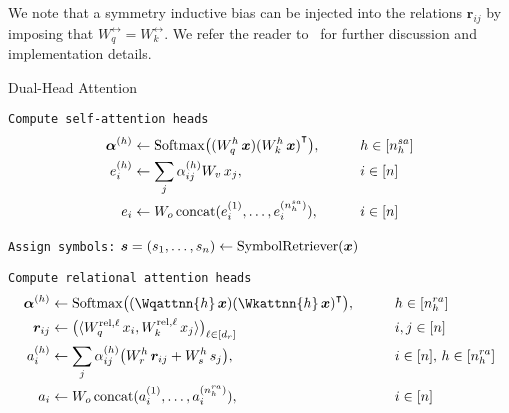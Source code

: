 We note that a symmetry inductive bias can be injected into the relations $\bm{r}_{ij}$ by imposing that $W_{q}^{\rel} = W_k^{\rel}$. We refer the reader to~ for further discussion and implementation details.


\begin{algorithm}[ht!]
	\caption{Dual-Head Attention}\label{alg:dual_head_attn}

    \vspace{1em}

    \texttt{Compute self-attention heads}
    \begin{align*}
        \bm{\alpha}^{(h)} &\gets \mathrm{Softmax}\big({(W_q^h\, \bm{x})} {(W_k^h\, \bm{x})}^\intercal\big), \qquad && h \in [n_h^{sa}] \\
        e_i^{(h)} &\gets \sum_{j} \alpha_{ij}^{(h)} W_v\, x_j, \qquad && i \in [n]\\
        e_i &\gets W_o \, \mathrm{concat}(e_i^{(1)}, \ldots, e_i^{(n_h^{sa})}), && i \in [n]
    \end{align*}

    \texttt{Assign symbols:} $\bm{s} = (s_1, \ldots, s_n) \gets \mathrm{SymbolRetriever}(\bm{x})$

    \texttt{Compute relational attention heads}
    \begin{align*}
        \bm{\alpha}^{(h)} &\gets \Softmax\bigparen{{(\Wqattnn{h}\, \x)} {(\Wkattnn{h}\, \x)}^\intercal}, \qquad && h \in [\nhra] \\
        \bm{r}_{ij} &\gets \bigparen{\iiprod{\Wqrell{\ell}\, x_i}{\Wkrell{\ell}\, x_j}}_{\ell \in [d_r]} \qquad && i,j \in [n] \\
        a_i^{(h)} &\gets \sum_{j} \alpha_{ij}^{(h)} \bigparen{W_r^h \, \bm{r}_{ij} + W_s^{h}\, s_j}, \qquad && i \in [n],\, h \in [\nhra]\\
        a_i &\gets W_o \, \concat(a_i^{(1)}, \ldots, a_i^{(\nhra)}), && i \in [n]
    \end{align*}


\end{algorithm}

